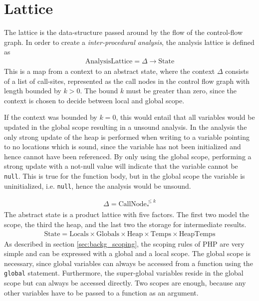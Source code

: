 \section{Lattice}
\label{sec:lattice}
The lattice is the data-structure passed around by the flow of the control-flow graph. In order to create a \emph{inter-procedural analysis}, the analysis lattice is defined as
\begin{align}
\text{AnalysisLattice} = \Delta \rightarrow \text{State}
\end{align}
This is a map from a context to an abstract state, where the context $\Delta$ consists of a list of call-sites, represented as the call nodes in the control flow graph with length bounded by $k>0$. The bound $k$ must be greater than zero, since the context is chosen to decide between local and global scope. 

If the context was bounded by $k=0$, this would entail that all variables would be updated in the global scope resulting in a unsound analysis. In the analysis the only strong update of the heap is performed when writing to a variable pointing to no locations which is sound, since the variable has not been initialized and hence cannot have been referenced. By only using the global scope, performing a strong update with a not-null value will indicate that the variable cannot be \texttt{null}. This is true for the function body, but in the global scope the variable is uninitialized, i.e. \texttt{null}, hence the analysis would be unsound.

\begin{align}
\Delta = \text{CallNode}_*^{\leq k}
\end{align}
The abstract state is a product lattice with five factors. The first two model the scope, the third the heap, and the last two the storage for intermediate results. 
\begin{align}
\text{State} = \text{Locals} \times \text{Globals} \times \text{Heap} \times \text{Temps} \times \text{HeapTemps} 
\end{align}
As described in section \ref{sec:backg_scoping}, the scoping rules of PHP are very simple and can be expressed with a global and a local scope. The global scope is necessary, since global variables can always be accessed from a function using the \texttt{global} statement. Furthermore, the super-global variables reside in the global scope but can always be accessed directly. Two scopes are enough, because any other variables have to be passed to a function as an argument.

